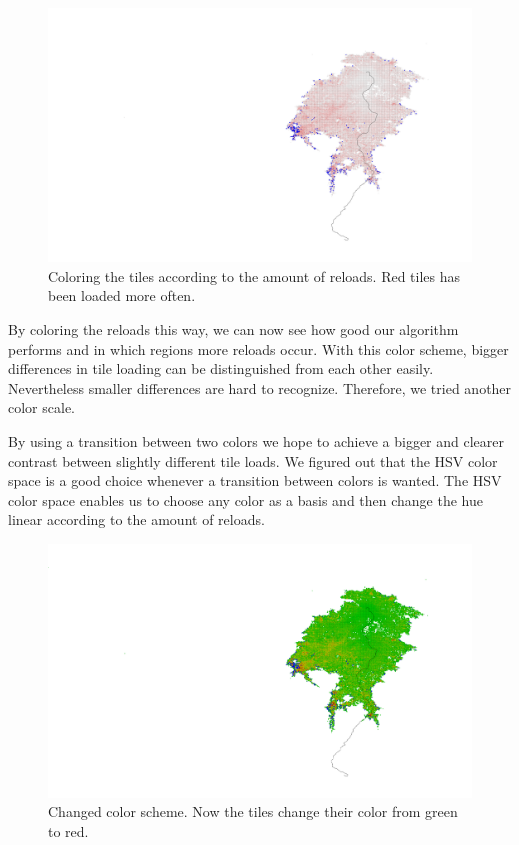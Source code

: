 \documentclass
[
    paper = a4,
    pagesize,
    12 pt,
    oneside,                       %
    open = right,
    DIV = calc,
    BCOR = 0 mm,                   %
    bibtotoc
]
{scrbook}
\begin{document}
\begin{figure}[H]
    \includegraphics[width=\textwidth]{Images/vis-rgb-cache.png}
\caption[]{Coloring the tiles according to the amount of reloads. Red tiles has been loaded more often.}
\label{fig:reload_coloring_white}
\end{figure}

By coloring the reloads this way, we can now see how good our algorithm performs and in which regions more reloads occur.
With this color scheme, bigger differences in tile loading can be distinguished from each other easily.
Nevertheless smaller differences are hard to recognize.
Therefore, we tried another color scale.


By using a transition between two colors we hope to achieve a bigger and clearer contrast between slightly different tile loads.
We figured out that the HSV color space is a good choice whenever a transition between colors is wanted.
The HSV color space enables us to choose any color as a basis and then change the hue linear according to the amount of reloads.

\begin{figure}[H]
    \includegraphics[width=\textwidth]{Images/vis-hsv-cache.png}
\caption[]{Changed color scheme. Now the tiles change their color from green to red.}
\label{fig:reload_coloring_hsv}
\end{figure}
\end{document}
